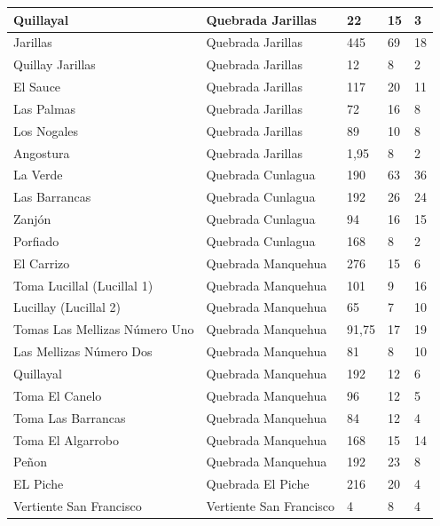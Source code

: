 \documentclass[]{article}
\begin{document}
\begin{longtable}{|p{4cm}|p{3cm}|p{2cm}|p{2.5cm}|p{2cm}|}
	Quillayal							& Quebrada Jarillas	  	  	& 22 	 & 15 	 & 3 	\\ \hline
	Jarillas							& Quebrada Jarillas	  	  	& 445 	 & 69	 & 18 	\\ \hline
	Quillay Jarillas					& Quebrada Jarillas	  	  	& 12 	 & 8 	 & 2 	\\ \hline
	El Sauce							& Quebrada Jarillas	      	& 117 	 & 20 	 & 11 	\\ \hline
	Las Palmas							& Quebrada Jarillas	  	  	& 72 	 & 16 	 & 8 	\\ \hline
	Los Nogales							& Quebrada Jarillas	  	  	& 89 	 & 10 	 & 8 	\\ \hline
	Angostura							& Quebrada Jarillas	      	& 1,95 	 & 8 	 & 2 	\\ \hline
	La Verde							& Quebrada Cunlagua	 	  	& 190 	 & 63 	 & 36 	\\ \hline
	Las Barrancas						& Quebrada Cunlagua		  	& 192 	 & 26 	 & 24 	\\ \hline
	Zanjón								& Quebrada Cunlagua		  	& 94 	 & 16	 & 15 	\\ \hline
	Porfiado							& Quebrada Cunlagua		  	& 168 	 & 8 	 & 2 	\\ \hline
	El Carrizo							& Quebrada Manquehua	  	& 276 	 & 15 	 & 6 	\\ \hline
	Toma Lucillal (Lucillal 1)			& Quebrada Manquehua	  	& 101 	 & 9	 & 16 	\\ \hline
	Lucillay (Lucillal 2)				& Quebrada Manquehua 	  	& 65	 & 7 	 & 10 	\\ \hline
	Tomas Las Mellizas Número Uno		& Quebrada Manquehua  	  	& 91,75  & 17 	 & 19 	\\ \hline
	Las Mellizas Número Dos				& Quebrada Manquehua      	& 81	 & 8 	 & 10 	\\ \hline
	Quillayal							& Quebrada Manquehua 	  	& 192 	 & 12 	 & 6 	\\ \hline
	Toma El Canelo						& Quebrada Manquehua 	  	& 96 	 & 12 	 & 5 	\\ \hline
	Toma Las Barrancas					& Quebrada Manquehua 	  	& 84 	 & 12 	 & 4 	\\ \hline
	Toma El Algarrobo					& Quebrada Manquehua  	  	& 168 	 & 15 	 & 14 	\\ \hline
	Peñon								& Quebrada Manquehua  	  	& 192 	 & 23 	 & 8 	\\ \hline
	EL Piche							& Quebrada El Piche  	  	& 216 	 & 20 	 & 4 	\\ \hline
	Vertiente San Francisco				& Vertiente San Francisco 	& 4 	 & 8 	 & 4 	\\ \hline

\end{longtable}
\end{document}
